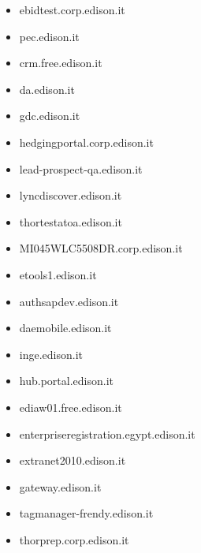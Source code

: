 \documentclass{article}
\begin{document}
\begin{itemize}
            \item ebidtest.corp.edison.it
        
            \item pec.edison.it
        
            \item crm.free.edison.it
        
            \item da.edison.it
        
            \item gdc.edison.it
        
            \item hedgingportal.corp.edison.it
        
            \item lead-prospect-qa.edison.it
        
            \item lyncdiscover.edison.it
        
            \item thortestatoa.edison.it
        
            \item MI045WLC5508DR.corp.edison.it
        
            \item etools1.edison.it
        
            \item authsapdev.edison.it
        
            \item daemobile.edison.it
        
            \item inge.edison.it
        
            \item hub.portal.edison.it
        
            \item ediaw01.free.edison.it
        
            \item enterpriseregistration.egypt.edison.it
        
            \item extranet2010.edison.it
        
            \item gateway.edison.it
        
            \item tagmanager-frendy.edison.it
        
            \item thorprep.corp.edison.it
        

\end{itemize}
\end{document}
